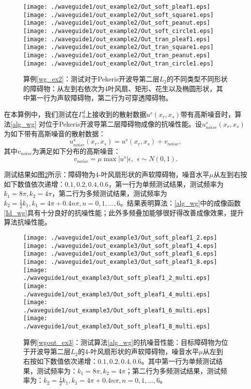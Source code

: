 \begin{figure}[h]
  \centering
  \texttt{[image: ./waveguide1/out\_example2/Out\_soft\_pleaf1.eps]}
  \texttt{[image: ./waveguide1/out\_example2/Out\_soft\_square1.eps]}
  \texttt{[image: ./waveguide1/out\_example2/Out\_soft\_peanut.eps]}
  \texttt{[image: ./waveguide1/out\_example2/Out\_soft\_circle1.eps]}
  \texttt{[image: ./waveguide1/out\_example2/Out\_tran\_pleaf1.eps]}
  \texttt{[image: ./waveguide1/out\_example2/Out\_tran\_square1.eps]}
  \texttt{[image: ./waveguide1/out\_example2/Out\_tran\_peanut.eps]}
  \texttt{[image: ./waveguide1/out\_example2/Out\_tran\_circle1.eps]}
  \caption{算例\ref{wg_ex2}：测试对于Pekeris开波导第二层$L_2$的不同类型不同形状的障碍物：从左到右依次为4叶风扇、矩形、花生以及椭圆形状，其中第一行为声软障碍物，第二行为可穿透障碍物。}
  \label{fig_wgout_ex2}
\end{figure}
\begin{example}[抗噪性及多频测试]\label{wgout_ex3}
在本算例中，我们测试在$\Gamma_0^d$上接收到的散射数据$u^s(x_r,x_s)$带有高斯噪音时，算法\ref{alg_wg} 对位于Pekeris开波导第二层障碍物成像的抗噪性能。设$u^s_{noise}(x_r,x_s)$ 为如下带有高斯噪音的散射数据：
$$ u^s_{noise}(x_r,x_s)=u^s(x_r,x_s)+v_{noise},$$
其中$v_{noise}$为满足如下分布的高斯噪音：
$$v_{noise}=\mu \max{|u^s|}\epsilon,\ \ \epsilon\sim N(0,1).$$

测试结果如图\ref{fig_wgout_ex3}所示：障碍物为4-叶风扇形状的声软障碍物，噪音水平$\mu$从左到右按如下数值依次递增：$0.1,0.2,0.4,0.6$，第一行为单频测试结果，测试频率为$k_1=8\pi,k_2=4\pi$，第二行为多频测试结果，测试频率为$k_2=\frac{1}{2}k_1,k_1=4\pi+0.4n\pi,n=0,1,\ldots,6$。结果表明算法：\ref{alg_wg}中的成像函数\eqref{Id_wg}具有十分良好的抗噪性能；此外多频叠加能够很好得改善成像效果，提升算法抗噪性能。
\end{example}
\begin{figure}[h]
  \centering
  \texttt{[image: ./waveguide1/out\_example3/Out\_soft\_pleaf1\_2.eps]}
  \texttt{[image: ./waveguide1/out\_example3/Out\_soft\_pleaf1\_4.eps]}
  \texttt{[image: ./waveguide1/out\_example3/Out\_soft\_pleaf1\_6.eps]}
  \texttt{[image: ./waveguide1/out\_example3/Out\_soft\_pleaf1\_8.eps]}
  \texttt{[image: ./waveguide1/out\_example3/Out\_soft\_pleaf1\_2\_multi.eps]}
  \texttt{[image: ./waveguide1/out\_example3/Out\_soft\_pleaf1\_4\_multi.eps]}
  \texttt{[image: ./waveguide1/out\_example3/Out\_soft\_pleaf1\_6\_multi.eps]}
  \texttt{[image: ./waveguide1/out\_example3/Out\_soft\_pleaf1\_8\_multi.eps]}
  \caption{算例\ref{wgout_ex3}：测试算法\ref{alg_wg}的抗噪音性能：目标障碍物为位于开波导第二层$L_2$的4-叶风扇形状的声软障碍物，噪音水平$\mu$从左到右按如下数值依次递增：$0.1,0.2,0.4,0.6$。其中第一行为单频测试结果，测试频率为：$k_1=8\pi,k_2=4\pi$；第二行为多频测试结果，测试频率为：$k_2=\frac{1}{2}k_1,k_1=4\pi+0.4n\pi,n=0,1,\ldots,6$。}\label{fig_wgout_ex3}
\end{figure}
